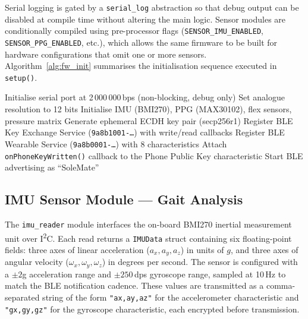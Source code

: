 \noindent Serial logging is gated by a \texttt{serial\_log} abstraction so that debug output can be disabled at compile time without altering the main logic.  Sensor modules are conditionally compiled using pre-processor flags (\texttt{SENSOR\_IMU\_ENABLED}, \texttt{SENSOR\_PPG\_ENABLED},
etc.), which allows the same firmware to be built for hardware configurations that omit one or
more sensors. \\


\noindent Algorithm~\ref{alg:fw_init} summarises the initialisation sequence executed in \texttt{setup()}.

\begin{algorithm}[htbp]
\caption{Arduino Firmware Initialisation (\texttt{setup()})}
\label{alg:fw_init}
\begin{algorithmic}[1]
  \STATE Initialise serial port at 2\,000\,000\,bps (non-blocking, debug only)
  \STATE Set analogue resolution to 12 bits
  \STATE Initialise IMU (BMI270), PPG (MAX30102), flex sensors, pressure matrix
  \STATE Generate ephemeral ECDH key pair (secp256r1)
  \STATE Register BLE Key Exchange Service (\texttt{9a8b1001-\ldots}) with write/read callbacks
  \STATE Register BLE Wearable Service (\texttt{9a8b0001-\ldots}) with 8 characteristics
  \STATE Attach \texttt{onPhoneKeyWritten()} callback to the Phone Public Key characteristic
  \STATE Start BLE advertising as \textquotedblleft SoleMate\textquotedblright
\end{algorithmic}
\end{algorithm}

\subsection{IMU Sensor Module — Gait Analysis}
\label{subsec:fw_imu}

\noindent The \texttt{imu\_reader} module interfaces the on-board BMI270 inertial measurement unit over
I\textsuperscript{2}C.  Each read returns a \texttt{IMUData} struct containing six
floating-point fields: three axes of linear acceleration ($a_x, a_y, a_z$) in units of $g$, and
three axes of angular velocity ($\omega_x, \omega_y, \omega_z$) in degrees per second.
The sensor is configured with a $\pm2$g acceleration range and $\pm250$\,dps gyroscope range,
sampled at 10\,Hz to match the BLE notification cadence.  These values are transmitted as a
comma-separated string of the form \texttt{"ax,ay,az"} for the accelerometer characteristic and
\texttt{"gx,gy,gz"} for the gyroscope characteristic, each encrypted before transmission. \\



